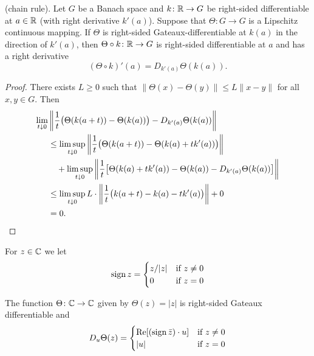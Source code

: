 \begin{proposition} \label{prop:b2-2.3}
(chain rule). Let $G$ be a Banach space and $k \colon \mathbb{R} \to G$ be right-sided differentiable at $a \in \mathbb{R}$ (with right derivative $k'(a)$).
Suppose that $\Theta \colon G \to G$ is a Lipschitz continuous mapping.
If\/ $\Theta$ is right-sided Gateaux-differentiable at $k(a)$ in the direction of\/ $k'(a)$, then $\Theta \circ k \colon \mathbb{R} \to G$ is right-sided differentiable at $a$ and has a right derivative
\begin{equation}\label{eq:b2-2.4}
(\Theta \circ k)'(a) = D_{k'(a)}\Theta(k(a)).
\end{equation}
\end{proposition}
\begin{proof}
There exists $L \geq 0$ such that $\|\Theta(x) - \Theta(y)\| \leq L\|x - y\|$ for all $x,y \in G$.
Then
\[
\begin{aligned}
\lim_{t \downarrow 0} &\left\|\frac{1}{t} \bigl(\Theta(k(a+t)) - \Theta(k(a))\bigr) - D_{k'(a)}\Theta(k(a))\right\| \\
&\leq \limsup_{t \downarrow 0} \left\|\frac{1}{t} \bigl(\Theta(k(a+t)) - \Theta(k(a)+tk'(a))\bigr)\right\| \\
&\quad + \limsup_{t \downarrow 0} \left\|\frac{1}{t} \bigl[\Theta(k(a)+tk'(a)) - \Theta(k(a)) - D_{k'(a)}\Theta(k(a))\bigr]\right\| \\
&\leq \limsup_{t \downarrow 0} L \cdot \left\|\frac{1}{t} \bigl(k(a+t) - k(a)-tk'(a)\bigr)\right\| + 0 \\
&= 0.
\qedhere
\end{aligned}
\]
\end{proof}
For $z \in \mathbb{C}$ we let
\begin{equation}\label{eq:b2-2.5}
\operatorname{sign} z = \begin{cases}
    z/|z| & \text{if } z \neq 0 \\
    0 & \text{if } z = 0
\end{cases}
\end{equation}
\begin{lemma}\label{lem:b2-2.4}
The function $\Theta \colon \mathbb{C} \to \mathbb{C}$ given by $\Theta(z) = |z|$ is right-sided Gateaux differentiable and
\begin{equation}\label{eq:b2-2.6}
D_{u}\Theta(z) = \begin{cases}
    \mathop{}\!\mathrm{Re}[(\operatorname{sign} \bar{z}) \cdot u] & \text{if } z \neq 0 \\
    |u| & \text{if } z = 0
\end{cases}
\end{equation}
\end{lemma}
